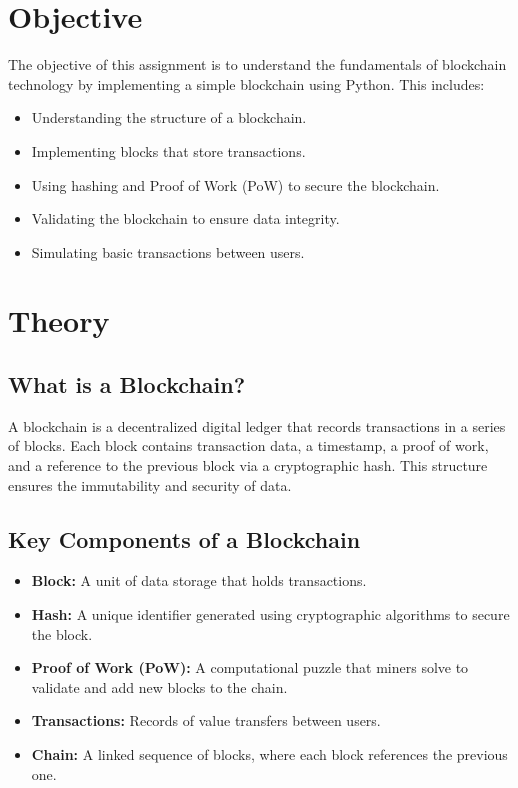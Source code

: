 \documentclass[11pt]{article}
\begin{document}
\tableofcontents
\thispagestyle{empty}
\clearpage

\section{Objective}

The objective of this assignment is to understand the fundamentals of blockchain technology by implementing a simple blockchain using Python. This includes:  
\begin{itemize}
    \item Understanding the structure of a blockchain.
    \item Implementing blocks that store transactions.
    \item Using hashing and Proof of Work (PoW) to secure the blockchain.
    \item Validating the blockchain to ensure data integrity.
    \item Simulating basic transactions between users.
\end{itemize}


\section{Theory}

\subsection{What is a Blockchain?}
A blockchain is a decentralized digital ledger that records transactions in a series of blocks. Each block contains transaction data, a timestamp, a proof of work, and a reference to the previous block via a cryptographic hash. This structure ensures the immutability and security of data.

\subsection{Key Components of a Blockchain}
\begin{itemize}
    \item \textbf{Block:} A unit of data storage that holds transactions.
    \item \textbf{Hash:} A unique identifier generated using cryptographic algorithms to secure the block.
    \item \textbf{Proof of Work (PoW):} A computational puzzle that miners solve to validate and add new blocks to the chain.
    \item \textbf{Transactions:} Records of value transfers between users.
    \item \textbf{Chain:} A linked sequence of blocks, where each block references the previous one.
\end{itemize}
\end{document}

